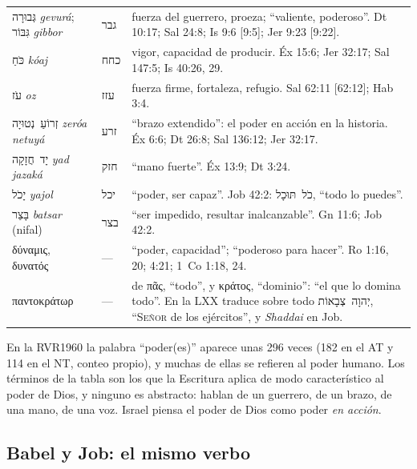 \documentclass[11pt,letterpaper]{article}
\newcommand{\heb}[1]{\mbox{\foreignlanguage{hebrew}{#1}}}
\newcommand{\grc}[1]{\foreignlanguage{ancientgreek}{#1}}
\newcommand{\SENOR}{\textsc{Señor}}
\begin{document}
\begin{filologia}
\begin{tabular}{@{}L{3.2cm}L{1.6cm}L{10cm}@{}}
\heb{גְּבוּרָה} \emph{gevurá}; \heb{גִּבּוֹר} \emph{gibbor} & \heb{גבר} & fuerza del guerrero, proeza; ``valiente, poderoso''. Dt 10:17; Sal 24:8; Is 9:6 [9:5]; Jer 9:23 [9:22]. \\[2pt]
\heb{כֹּחַ} \emph{kóaj} & \heb{כחח} & vigor, capacidad de producir. Éx 15:6; Jer 32:17; Sal 147:5; Is 40:26, 29. \\[2pt]
\heb{עֹז} \emph{oz} & \heb{עזז} & fuerza firme, fortaleza, refugio. Sal 62:11 [62:12]; Hab 3:4. \\[2pt]
\heb{זְרוֹעַ נְטוּיָה} \emph{zeróa netuyá} & \heb{זרע} & ``brazo extendido'': el poder en acción en la historia. Éx 6:6; Dt 26:8; Sal 136:12; Jer 32:17. \\[2pt]
\heb{יָד חֲזָקָה} \emph{yad jazaká} & \heb{חזק} & ``mano fuerte''. Éx 13:9; Dt 3:24. \\[2pt]
\heb{יָכֹל} \emph{yajol} & \heb{יכל} & ``poder, ser capaz''. Job 42:2: \heb{כֹל תּוּכָל}, ``todo lo puedes''. \\[2pt]
\heb{בָּצַר} \emph{batsar} (nifal) & \heb{בצר} & ``ser impedido, resultar inalcanzable''. Gn 11:6; Job 42:2. \\[2pt]
\grc{δύναμις}, \grc{δυνατός} & --- & ``poder, capacidad''; ``poderoso para hacer''. Ro 1:16, 20; 4:21; 1~Co 1:18, 24. \\[2pt]
\grc{παντοκράτωρ} & --- & de \grc{πᾶς}, ``todo'', y \grc{κράτος}, ``dominio'': ``el que lo domina todo''. En la LXX traduce sobre todo \heb{יְהוָה צְבָאוֹת}, ``\SENOR{} de los ejércitos'', y \emph{Shaddai} en Job. \\
\end{tabular}
\end{filologia}

En la RVR1960 la palabra ``poder(es)'' aparece unas 296 veces (182 en el AT y 114 en el NT, conteo propio), y muchas de ellas se refieren al poder humano. Los términos de la tabla son los que la Escritura aplica de modo característico al poder de Dios, y ninguno es abstracto: hablan de un guerrero, de un brazo, de una mano, de una voz. Israel piensa el poder de Dios como poder \emph{en acción}.

\subsection{Babel y Job: el mismo verbo}
\end{document}
